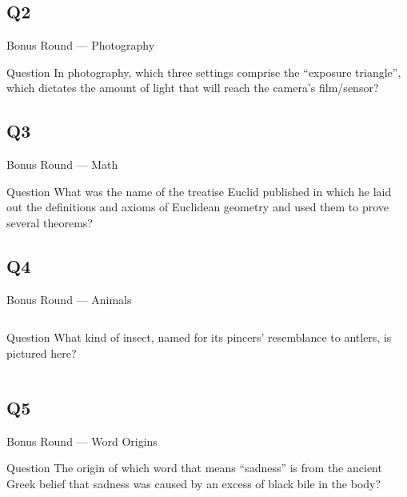 \documentclass[11pt]{beamer}
\begin{document}
\subsection*{Q2}
\begin{frame}[t]{Bonus Round --- Photography}
\vspace{-0.5em}
\begin{block}{Question}
In photography, which three settings comprise the ``exposure triangle'', which dictates the amount of light that will reach the camera's film/sensor?
\end{block}
\end{frame}
\subsection*{Q3}
\begin{frame}[t]{Bonus Round --- Math}
\vspace{-0.5em}
\begin{block}{Question}
What was the name of the treatise Euclid published in which he laid out the definitions and axioms of Euclidean geometry and used them to prove several theorems?
\end{block}
\end{frame}
\subsection*{Q4}
\begin{frame}[t]{Bonus Round --- Animals}
\vspace{-0.5em}
\begin{columns}[T,totalwidth=\linewidth]
\begin{column}{0.32\linewidth}
\begin{block}{Question}
What kind of insect, named for its pincers' resemblance to antlers, is pictured here?
\end{block}
\end{column}
\begin{column}{0.65\linewidth}
\begin{center}
\texttt{[image: \{Images/stagbeetle]}.jpg}
\end{center}
\end{column}
\end{columns}
\end{frame}
\subsection*{Q5}
\begin{frame}[t]{Bonus Round --- Word Origins}
\vspace{-0.5em}
\begin{block}{Question}
The origin of which word that means ``sadness'' is from the ancient Greek belief that sadness was caused by an excess of black bile in the body?
\end{block}
\end{frame}
\end{document}
